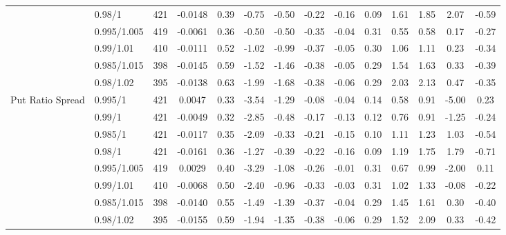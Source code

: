 \begin{tabular}{llcccccccccccc}
 & 0.98/1 & 421 & -0.0148 & 0.39 & -0.75 & -0.50 & -0.22 & -0.16 & 0.09 & 1.61 & 1.85 & 2.07 & -0.59 \\
 & 0.995/1.005 & 419 & -0.0061 & 0.36 & -0.50 & -0.50 & -0.35 & -0.04 & 0.31 & 0.55 & 0.58 & 0.17 & -0.27 \\
 & 0.99/1.01 & 410 & -0.0111 & 0.52 & -1.02 & -0.99 & -0.37 & -0.05 & 0.30 & 1.06 & 1.11 & 0.23 & -0.34 \\
 & 0.985/1.015 & 398 & -0.0145 & 0.59 & -1.52 & -1.46 & -0.38 & -0.05 & 0.29 & 1.54 & 1.63 & 0.33 & -0.39 \\
 & 0.98/1.02 & 395 & -0.0138 & 0.63 & -1.99 & -1.68 & -0.38 & -0.06 & 0.29 & 2.03 & 2.13 & 0.47 & -0.35 \\
Put Ratio Spread & 0.995/1 & 421 & 0.0047 & 0.33 & -3.54 & -1.29 & -0.08 & -0.04 & 0.14 & 0.58 & 0.91 & -5.00 & 0.23 \\
 & 0.99/1 & 421 & -0.0049 & 0.32 & -2.85 & -0.48 & -0.17 & -0.13 & 0.12 & 0.76 & 0.91 & -1.25 & -0.24 \\
 & 0.985/1 & 421 & -0.0117 & 0.35 & -2.09 & -0.33 & -0.21 & -0.15 & 0.10 & 1.11 & 1.23 & 1.03 & -0.54 \\
 & 0.98/1 & 421 & -0.0161 & 0.36 & -1.27 & -0.39 & -0.22 & -0.16 & 0.09 & 1.19 & 1.75 & 1.79 & -0.71 \\
 & 0.995/1.005 & 419 & 0.0029 & 0.40 & -3.29 & -1.08 & -0.26 & -0.01 & 0.31 & 0.67 & 0.99 & -2.00 & 0.11 \\
 & 0.99/1.01 & 410 & -0.0068 & 0.50 & -2.40 & -0.96 & -0.33 & -0.03 & 0.31 & 1.02 & 1.33 & -0.08 & -0.22 \\
 & 0.985/1.015 & 398 & -0.0140 & 0.55 & -1.49 & -1.39 & -0.37 & -0.04 & 0.29 & 1.45 & 1.61 & 0.30 & -0.40 \\
 & 0.98/1.02 & 395 & -0.0155 & 0.59 & -1.94 & -1.35 & -0.38 & -0.06 & 0.29 & 1.52 & 2.09 & 0.33 & -0.42 \\
\bottomrule
\end{tabular}

